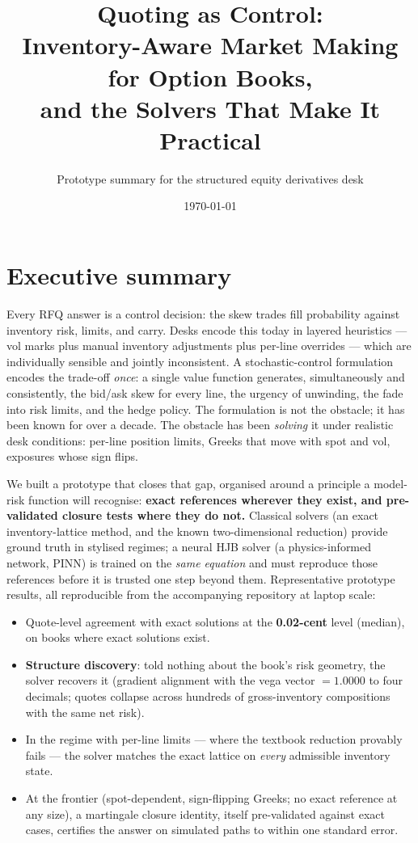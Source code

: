 \documentclass[11pt,a4paper]{article}
\title{\vspace{-1.2em}\Large\textbf{Quoting as Control:\\
Inventory-Aware Market Making for Option Books,\\
and the Solvers That Make It Practical}\vspace{-0.4em}}
\author{\normalsize Prototype summary for the structured equity derivatives desk}
\date{\normalsize \today}
\begin{document}
\maketitle
\vspace{-1.6em}

\section*{Executive summary}

Every RFQ answer is a control decision: the skew trades fill probability
against inventory risk, limits, and carry. Desks encode this today in
layered heuristics --- vol marks plus manual inventory adjustments plus
per-line overrides --- which are individually sensible and jointly
inconsistent. A stochastic-control formulation encodes the trade-off
\emph{once}: a single value function generates, simultaneously and
consistently, the bid/ask skew for every line, the urgency of unwinding,
the fade into risk limits, and the hedge policy. The formulation is not the
obstacle; it has been known for over a decade. The obstacle has been
\emph{solving} it under realistic desk conditions: per-line position
limits, Greeks that move with spot and vol, exposures whose sign flips.

We built a prototype that closes that gap, organised around a principle a
model-risk function will recognise: \textbf{exact references wherever they
exist, and pre-validated closure tests where they do not.} Classical
solvers (an exact inventory-lattice method, and the known two-dimensional
reduction) provide ground truth in stylised regimes; a neural HJB solver
(a physics-informed network, PINN) is trained on the \emph{same equation}
and must reproduce those references before it is trusted one step beyond
them. Representative prototype results, all reproducible from the
accompanying repository at laptop scale:

\begin{itemize}\itemsep0.15em
\item Quote-level agreement with exact solutions at the
  \textbf{0.02-cent} level (median), on books where exact solutions exist.
\item \textbf{Structure discovery}: told nothing about the book's risk
  geometry, the solver recovers it (gradient alignment with the vega
  vector $=1.0000$ to four decimals; quotes collapse across hundreds of
  gross-inventory compositions with the same net risk).
\item In the regime with per-line limits --- where the textbook reduction
  provably fails --- the solver matches the exact lattice on \emph{every}
  admissible inventory state.
\item At the frontier (spot-dependent, sign-flipping Greeks; no exact
  reference at any size), a martingale closure identity, itself
  pre-validated against exact cases, certifies the answer on simulated
  paths to within one standard error.
\end{itemize}
\end{document}
